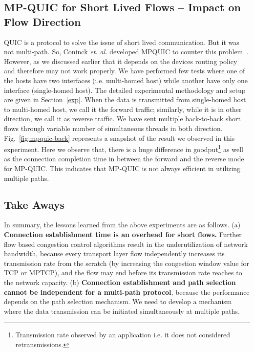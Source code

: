\subsection{MP-QUIC for Short Lived Flows -- Impact on Flow Direction}
QUIC is a protocol to solve the issue of short lived communication. But it was not multi-path. So, Coninck {\em et. al.} developed MPQUIC to counter this problem~\cite{mpquic-measure}. However, as we discussed earlier that it depends on the devices routing policy and therefore may not work properly. We have performed few tests where one of the hosts have two interfaces (i.e. multi-homed host) while another have only one interface (single-homed host). The detailed experimental methodology and setup are given in Section~\ref{exp}.  When the data is transmitted from single-homed host to multi-homed host, we call it the forward traffic; similarly, while it is in other direction, we call it as reverse traffic. We have sent multiple back-to-back short flows through variable number of simultaneous threads in both direction. Fig.~\ref{fig:mpquic-back} represents a snapshot of the result we observed in this experiment.  Here we observe that, there is a huge difference in goodput\footnote{Transmission rate observed by an application i.e. it does not considered retransmissions.} as well as the connection completion time in between the forward and the reverse mode for MP-QUIC. This indicates that MP-QUIC is not always efficient in utilizing multiple paths.

\subsection{Take Aways}
In summary, the lessons learned from the above experiments are as follows. (a) \textbf{Connection establishment time is an overhead for short flows.} Further flow based congestion control algorithms result in the underutilization of network bandwidth, because every transport layer flow independently increases its transmission rate from the scratch (by increasing the congestion window value for TCP or MPTCP), and the flow may end before its transmission rate reaches to the network capacity. 
(b) \textbf{Connection establishment and path selection cannot be independent for a multi-path protocol}, because the performance depends on the path selection mechanism. We need to develop a mechanism where the data transmission can be initiated simultaneously at multiple paths.  
